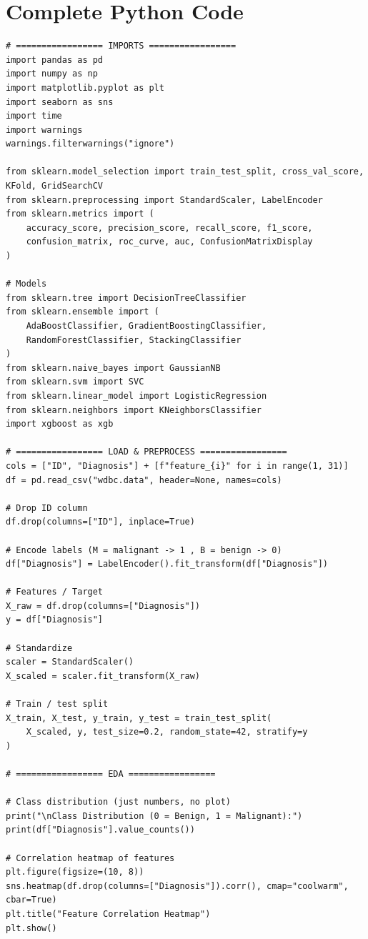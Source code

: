 \documentclass[12pt,a4paper]{article}
\begin{document}
\section*{Complete Python Code}
\begin{lstlisting}[style=python]
# ================= IMPORTS =================
import pandas as pd
import numpy as np
import matplotlib.pyplot as plt
import seaborn as sns
import time
import warnings
warnings.filterwarnings("ignore")

from sklearn.model_selection import train_test_split, cross_val_score, KFold, GridSearchCV
from sklearn.preprocessing import StandardScaler, LabelEncoder
from sklearn.metrics import (
    accuracy_score, precision_score, recall_score, f1_score,
    confusion_matrix, roc_curve, auc, ConfusionMatrixDisplay
)

# Models
from sklearn.tree import DecisionTreeClassifier
from sklearn.ensemble import (
    AdaBoostClassifier, GradientBoostingClassifier,
    RandomForestClassifier, StackingClassifier
)
from sklearn.naive_bayes import GaussianNB
from sklearn.svm import SVC
from sklearn.linear_model import LogisticRegression
from sklearn.neighbors import KNeighborsClassifier
import xgboost as xgb

# ================= LOAD & PREPROCESS =================
cols = ["ID", "Diagnosis"] + [f"feature_{i}" for i in range(1, 31)]
df = pd.read_csv("wdbc.data", header=None, names=cols)

# Drop ID column
df.drop(columns=["ID"], inplace=True)

# Encode labels (M = malignant -> 1 , B = benign -> 0)
df["Diagnosis"] = LabelEncoder().fit_transform(df["Diagnosis"])

# Features / Target
X_raw = df.drop(columns=["Diagnosis"])
y = df["Diagnosis"]

# Standardize
scaler = StandardScaler()
X_scaled = scaler.fit_transform(X_raw)

# Train / test split
X_train, X_test, y_train, y_test = train_test_split(
    X_scaled, y, test_size=0.2, random_state=42, stratify=y
)

# ================= EDA =================

# Class distribution (just numbers, no plot)
print("\nClass Distribution (0 = Benign, 1 = Malignant):")
print(df["Diagnosis"].value_counts())

# Correlation heatmap of features
plt.figure(figsize=(10, 8))
sns.heatmap(df.drop(columns=["Diagnosis"]).corr(), cmap="coolwarm", cbar=True)
plt.title("Feature Correlation Heatmap")
plt.show()


\end{lstlisting}
\end{document}
